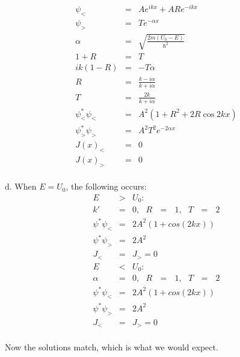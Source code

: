 \documentclass[11pt]{amsart}
\begin{document}
\begin{eqnarray*}
\psi_{<} &=& Ae^{ikx}+ARe^{-ikx} \\
\psi_{>} &=& Te^{-\alpha{x}} \\
\alpha &=& \sqrt{\frac{2m(U_{0}-E)}{\hbar^{2}}} \\
1+R &=& T \\
ik(1-R) &=& -T\alpha\\ 
R &=& \frac{k-i\alpha}{k+i\alpha} \\
T  &=& \frac{2k}{k+i\alpha} \\
\psi_{<}^{*}\psi_{<} &=& A^{2}(1+R^{2}+2R\cos{2kx}) \\
\psi_{>}^{*}\psi_{>} &=& A^{2}T^{2}e^{-2\alpha{x}} \\
J(x)_{<} &=& 0  \\
J(x)_{>} &=& 0 
\end{eqnarray*} \\
d. When $E=U_{0}$, the following occurs: \\
\begin{eqnarray*} 
E &>& U_{0}: \\
k'&=&0,\mbox{  } R\mbox{  }=\mbox{  }1,\mbox{  }   T\mbox{  }=\mbox{  }2 \\
\psi^{*}\psi_{<} &=& 2A^{2}(1+cos(2kx)) \\
\psi^{*}\psi_{>} &=& 2A^{2} \\
J_{<} &=& J_{>} = 0 \\
E &<& U_{0}: \\
\alpha&=&0,\mbox{  } R\mbox{  }=\mbox{  }1,\mbox{  }   T\mbox{  }=\mbox{  }2 \\
\psi^{*}\psi_{<} &=& 2A^{2}(1+cos(2kx)) \\
\psi^{*}\psi_{>} &=& 2A^{2} \\
J_{<} &=& J_{>} = 0 
\end{eqnarray*} \\
Now the solutions match, which is what we would expect. \\ \\
\end{document}
